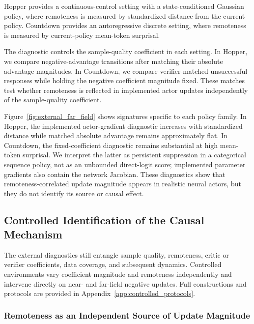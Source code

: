 Hopper provides a continuous-control setting with a state-conditioned Gaussian
policy,
where remoteness is measured by standardized distance from the current
policy. Countdown provides an autoregressive discrete setting, where
remoteness is measured by current-policy mean-token surprisal.

The diagnostic controls the sample-quality coefficient in each setting.
In Hopper, we compare negative-advantage transitions after matching their
absolute advantage magnitudes. In Countdown, we compare verifier-matched
unsuccessful responses while holding the negative coefficient magnitude
fixed. These matches test whether remoteness is reflected in implemented actor
updates independently of the sample-quality coefficient.

Figure~\ref{fig:external_far_field} shows signatures specific to each policy
family. In Hopper, the implemented actor-gradient diagnostic
increases with standardized distance while matched absolute advantage
remains approximately flat. In Countdown, the fixed-coefficient
diagnostic remains substantial at high mean-token surprisal. We interpret
the latter as persistent suppression in a categorical sequence policy,
not as an unbounded direct-logit score; implemented parameter gradients
also contain the network Jacobian. These diagnostics show that
remoteness-correlated update magnitude appears in realistic neural actors, but
they do not identify its source or causal effect.




\subsection{Controlled Identification of the Causal Mechanism}
\label{sec:controlled_identification}

The external diagnostics still entangle sample quality, remoteness, critic or
verifier coefficients, data coverage, and subsequent dynamics. Controlled
environments vary coefficient magnitude and remoteness independently and
intervene directly on near- and far-field negative updates. Full constructions
and protocols are provided in
Appendix~\ref{app:controlled_protocols}.

\subsubsection{Remoteness as an Independent Source of Update Magnitude}
\label{sec:controlled_source}

